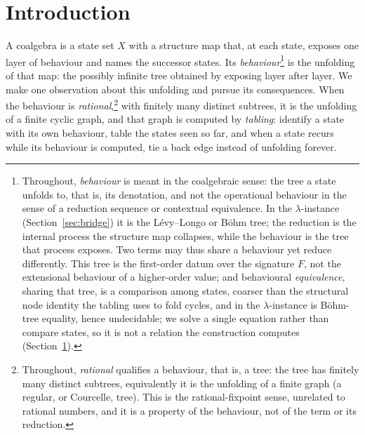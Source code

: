 
\maketitle

\section{Introduction}\label{sec:intro}
A coalgebra is a state set $X$ with a structure map that, at each state, exposes one
layer of behaviour and names the successor states. Its \emph{behaviour}\footnote{Throughout,
  \emph{behaviour} is meant in the coalgebraic sense: the tree a state unfolds to, that is, its
  denotation, and not the operational behaviour in the sense of a reduction sequence or contextual
  equivalence. In the $\lambda$-instance (Section~\ref{sec:bridge}) it is the L\'evy--Longo or B\"ohm
  tree; the reduction is the internal process the structure map collapses, while the behaviour is the
tree that process exposes. Two terms may thus share a behaviour yet reduce differently. This tree is the
  first-order datum over the signature $F$, not the extensional behaviour of a higher-order value; and
  behavioural \emph{equivalence}, sharing that tree, is a comparison among states, coarser than the
  structural node identity the tabling uses to fold cycles, and in the $\lambda$-instance is B\"ohm-tree
  equality, hence undecidable; we solve a single equation rather than compare states, so it is not a
  relation the construction computes (Section~\ref{sec:intro}).} is the
unfolding of that map: the possibly infinite tree obtained by exposing layer after layer. We make one
observation about this unfolding and pursue its consequences. When the behaviour is
\emph{rational},\footnote{Throughout, \emph{rational} qualifies a behaviour, that is, a tree: the
  tree has finitely many distinct subtrees, equivalently it is the unfolding of a finite graph (a
  regular, or Courcelle, tree). This is the rational-fixpoint sense, unrelated to rational numbers,
and it is a property of the behaviour, not of the term or its reduction.} with finitely many
distinct subtrees, it is the unfolding of a finite
cyclic graph, and that graph is computed by \emph{tabling}: identify a state with its own
behaviour, table the states seen so far, and when a state recurs while its behaviour is computed,
tie a back edge instead of unfolding forever.

